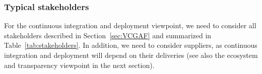   



 


\subsubsection{Typical stakeholders} 

For the continuous integration and deployment viewpoint, we need to consider all stakeholders described in Section~\ref{sec:VCGAF} and summarized in Table~\ref{tab:stakeholders}.
In addition, we need to consider suppliers, as continuous integration and deployment will depend on their deliveries (see also the ecosystem and transparency viewpoint in the next section).

